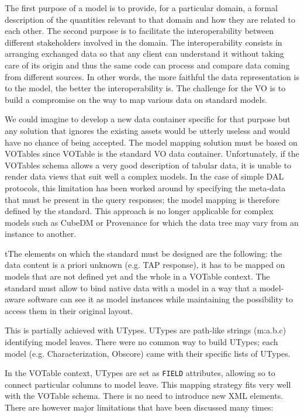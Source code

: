 
The first purpose of a model is to provide, for a particular domain, a formal description of the quantities relevant to that domain and how they are related to each other.
The second purpose is to facilitate the interoperability between  different stakeholders involved in the domain. The interoperability consists in arranging exchanged data 
so that any client can understand it without taking care of its origin and thus the same code can process and compare data coming from different sources.  
In other words, the more faithful the data representation is to the model, the better the interoperability is.
The challenge for the VO is to build a compromise on the way to map various data on standard models.

We could imagine to develop a new data container specific for that purpose but any solution that ignores the existing assets would be utterly useless and would have no chance of being accepted.
The model mapping solution must be based on VOTables since VOTable  \citep{2019ivoa.spec.1021O} is the standard VO data container.
Unfortunately, if the VOTables schema allows a very good description of tabular data, it is unable to render data views that suit well a complex models.
In the case of simple DAL protocols, this limitation has been worked around by specifying the meta-data that must be present in the query responses; the model mapping is therefore defined by the standard.
This approach is no longer applicable for complex models such as CubeDM or Provenance for which the data tree may vary from an instance to another.

tThe elements on which the standard must be designed are the following: the data content is a priori unknown (e.g. TAP response), it has to be mapped on models that are not defined yet and the whole in a VOTable context.
The standard must allow to bind native data with a model in a way that a model-aware software can see it as 
model instances while maintaining the possibility to access them in their original layout.

This is partially achieved with UTypes. 
UTypes are path-like strings (m:a.b.c) identifying model leaves. There were no common way to build UTypes; each model (e.g. Characterization, Obscore)  came with their specific lists of UTypes. 

In the VOTable context, UTypes are set as \texttt{FIELD} attributes, allowing so to connect particular columns to model leave. This mapping strategy fits very well with the VOTable schema. There is no need to introduce new XML elements. There are however major limitations that have been discussed many times:

